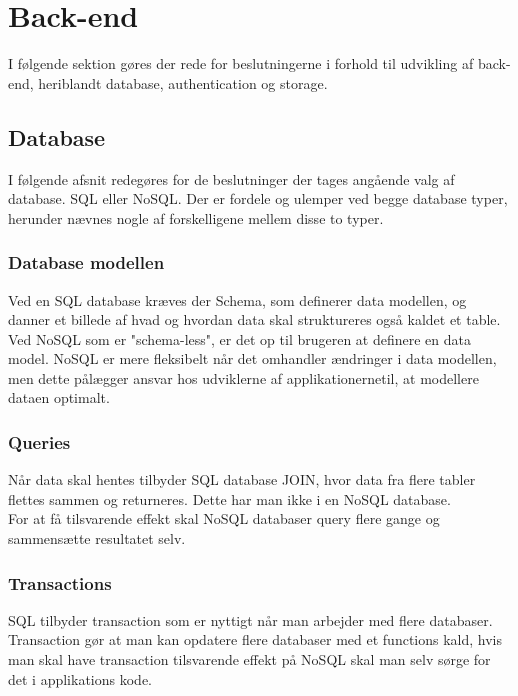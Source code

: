 \section{Back-end}
I følgende sektion gøres der rede for beslutningerne i forhold til udvikling af back-end, heriblandt database, authentication og storage.

\subsection{Database}
I følgende afsnit redegøres for de beslutninger der tages angående valg af database. SQL eller NoSQL.
Der er fordele og ulemper ved begge database typer, herunder nævnes nogle af forskelligene mellem disse to typer.

\subsubsection{Database modellen}

Ved en SQL database kræves der Schema, som definerer data modellen, og danner et billede af hvad og hvordan data skal struktureres også kaldet et table. Ved NoSQL som er "schema-less", er det op til brugeren at definere en data model. NoSQL er mere fleksibelt når det omhandler ændringer i data modellen, men dette pålægger ansvar hos udviklerne af applikationernetil, at modellere dataen optimalt.\\

\subsubsection{Queries\cite{Query}}
Når data skal hentes tilbyder SQL database JOIN\cite{JOIN}, hvor data fra flere tabler flettes sammen og returneres. Dette har man ikke i en NoSQL database. \\
For at få tilsvarende effekt skal NoSQL databaser query flere gange og sammensætte resultatet selv.

\subsubsection{Transactions\cite{Transactions}}
 SQL tilbyder transaction som er nyttigt når man arbejder med flere databaser. Transaction gør at man kan opdatere flere databaser med et functions kald, hvis man skal have transaction tilsvarende effekt på NoSQL skal man selv sørge for det i applikations kode. 


